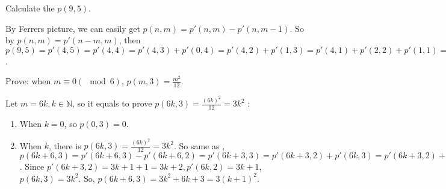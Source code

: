 \documentclass{ctexart}
\begin{document}
\begin{problem}\label{pro:2}
    Calculate the $p(9,5)$.
\end{problem}
\begin{solution}
    By Ferrers picture, we can easily get $p(n,m)=p'(n,m)-p'(n,m-1)$.
    So by  $p(n,m)=p'(n-m,m)$, then $p(9,5)=p'(4,5)=p'(4,4)=p'(4,3)+p'(0,4)=p'(4,2)+p'(1,3)=p'(4,1)+p'(2,2)+p'(1,1)=p'(4,1)+p'(2,1)+p'(0,2)+p'(1,1)=1+1+0+1=3$.
\end{solution}


\begin{problem}
    Prove: when $m\equiv 0(\mod 6)$, $p(m,3)=\frac{m^2}{12}$. 
\end{problem}
\begin{solution}
    Let $m=6k, k\in \mathbb{N}$, so it equals to prove $p(6k,3)=\frac{(6k)^2}{12}=3k^2$ :
    \begin{enumerate}
        \item When $k=0$, so $p(0,3)=0$.
        \item When $k$, there is $p(6k,3)=\frac{(6k)^2}{12}=3k^2$. So same as , $p(6k+6,3)=p'(6k+6,3)-p'(6k+6,2)=p'(6k+3,3)=p'(6k+3,2)+p'(6k,3)=p'(6k+3,2)+p'(6k,2)+p(6k,3)$. Since $p'(6k+3,2)=3k+1+1=3k+2,p'(6k,2)=3k+1$, $p(6k,3)=3k^2$. So, $p(6k+6,3)=3k^2+6k+3=3(k+1)^2$.
    \end{enumerate}
    
\end{solution}
\end{document}
